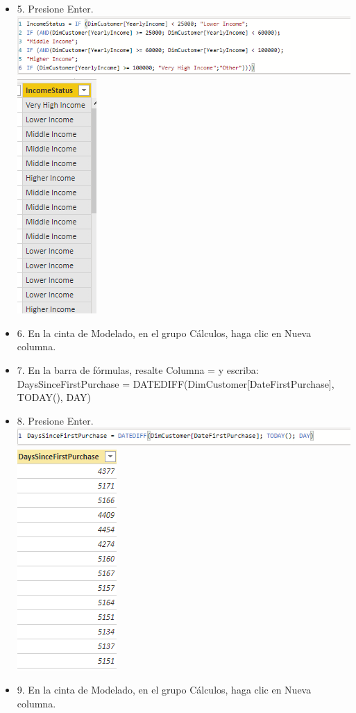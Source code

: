 \begin{itemize}
\item 5. Presione Enter. \\
\includegraphics[scale=0.5]{./Imagenes/image016}
\includegraphics[scale=0.5]{./Imagenes/image017}

\item 6. En la cinta de Modelado, en el grupo Cálculos, haga clic en Nueva columna.
\item 7. En la barra de fórmulas, resalte Columna = y escriba: \\
DaysSinceFirstPurchase = DATEDIFF(DimCustomer[DateFirstPurchase], TODAY(), DAY) \\
\item 8. Presione Enter. \\
\includegraphics[scale=0.5]{./Imagenes/image018}
\includegraphics[scale=0.5]{./Imagenes/image019}
\item 9. En la cinta de Modelado, en el grupo Cálculos, haga clic en Nueva columna.


\end{itemize}
